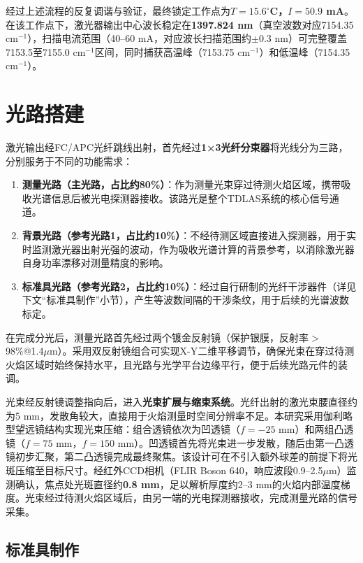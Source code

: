 经过上述流程的反复调谐与验证，最终锁定工作点为\textbf{$T=15.6^\circ$C，$I=50.9$ mA}。在该工作点下，激光器输出中心波长稳定在\textbf{1397.824 nm}（真空波数对应7154.35 cm$^{-1}$），扫描电流范围（40--60 mA，对应波长扫描范围约$\pm$0.3 nm）可完整覆盖7153.5至7155.0 cm$^{-1}$区间，同时捕获高温峰（7153.75 cm$^{-1}$）和低温峰（7154.35 cm$^{-1}$）。

\section{光路搭建}

激光输出经FC/APC光纤跳线出射，首先经过\textbf{1×3光纤分束器}将光线分为三路，分别服务于不同的功能需求：

\begin{enumerate}
	\item \textbf{测量光路（主光路，占比约80\%）}：作为测量光束穿过待测火焰区域，携带吸收光谱信息后被光电探测器接收。该路光是整个TDLAS系统的核心信号通道。
	\item \textbf{背景光路（参考光路1，占比约10\%）}：不经待测区域直接进入探测器，用于实时监测激光器出射光强的波动，作为吸收光谱计算的背景参考，以消除激光器自身功率漂移对测量精度的影响。
	\item \textbf{标准具光路（参考光路2，占比约10\%）}：经过自行研制的光纤干涉器件（详见下文“标准具制作”小节），产生等波数间隔的干涉条纹，用于后续的光谱波数标定。
\end{enumerate}

在完成分光后，测量光路首先经过两个镀金反射镜（保护银膜，反射率$>$98\%@1.4$\mu$m）。采用双反射镜组合可实现X-Y二维平移调节，确保光束在穿过待测火焰区域时始终保持水平，且光路与光学平台边缘平行，便于后续光路元件的装调。

光束经反射镜调整指向后，进入\textbf{光束扩展与缩束系统}。光纤出射的激光束腰直径约为5 mm，发散角较大，直接用于火焰测量时空间分辨率不足。本研究采用伽利略型望远镜结构实现光束压缩：组合透镜依次为凹透镜（$f=-25$ mm）和两组凸透镜（$f=75$ mm，$f=150$ mm）。凹透镜首先将光束进一步发散，随后由第一凸透镜初步汇聚，第二凸透镜完成最终聚焦。该设计可在不引入额外球差的前提下将光斑压缩至目标尺寸。经红外CCD相机（FLIR Boson 640，响应波段0.9--2.5$\mu$m）监测确认，焦点处光斑直径约\textbf{0.8 mm}，足以解析厚度约2--3 mm的火焰内部温度梯度。光束经过待测火焰区域后，由另一端的光电探测器接收，完成测量光路的信号采集。

\subsection{标准具制作}

